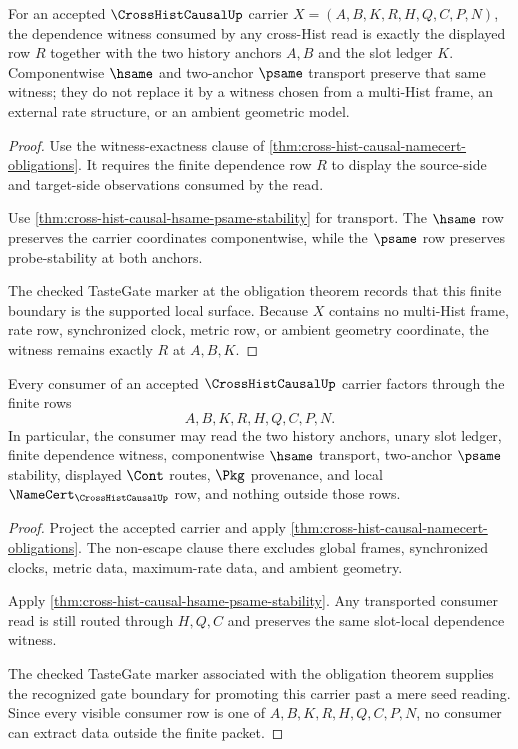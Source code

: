 \begin{theorem}
\label{thm:cross-hist-causal-witness-exactness}
For an accepted $\CrossHistCausalUp$ carrier $X=(A,B,K,R,H,Q,C,P,N)$, the dependence witness consumed by any cross-Hist read is exactly the displayed row $R$ together with the two history anchors $A,B$ and the slot ledger $K$. Componentwise $\hsame$ and two-anchor $\psame$ transport preserve that same witness; they do not replace it by a witness chosen from a multi-Hist frame, an external rate structure, or an ambient geometric model.
\end{theorem}
\begin{proof}
Use the witness-exactness clause of \autoref{thm:cross-hist-causal-namecert-obligations}. It requires the finite dependence row $R$ to display the source-side and target-side observations consumed by the read.

Use \autoref{thm:cross-hist-causal-hsame-psame-stability} for transport. The $\hsame$ row preserves the carrier coordinates componentwise, while the $\psame$ row preserves probe-stability at both anchors.

The checked TasteGate marker at the obligation theorem records that this finite boundary is the supported local surface. Because $X$ contains no multi-Hist frame, rate row, synchronized clock, metric row, or ambient geometry coordinate, the witness remains exactly $R$ at $A,B,K$.
\end{proof}

\begin{theorem}
\label{thm:cross-hist-causal-non-escape}
Every consumer of an accepted $\CrossHistCausalUp$ carrier factors through the finite rows
$$
A,B,K,R,H,Q,C,P,N.
$$
In particular, the consumer may read the two history anchors, unary slot ledger, finite dependence witness, componentwise $\hsame$ transport, two-anchor $\psame$ stability, displayed $\Cont$ routes, $\Pkg$ provenance, and local $\NameCert_{\CrossHistCausalUp}$ row, and nothing outside those rows.
\end{theorem}
\begin{proof}
Project the accepted carrier and apply \autoref{thm:cross-hist-causal-namecert-obligations}. The non-escape clause there excludes global frames, synchronized clocks, metric data, maximum-rate data, and ambient geometry.

Apply \autoref{thm:cross-hist-causal-hsame-psame-stability}. Any transported consumer read is still routed through $H,Q,C$ and preserves the same slot-local dependence witness.

The checked TasteGate marker associated with the obligation theorem supplies the recognized gate boundary for promoting this carrier past a mere seed reading. Since every visible consumer row is one of $A,B,K,R,H,Q,C,P,N$, no consumer can extract data outside the finite packet.
\end{proof}

